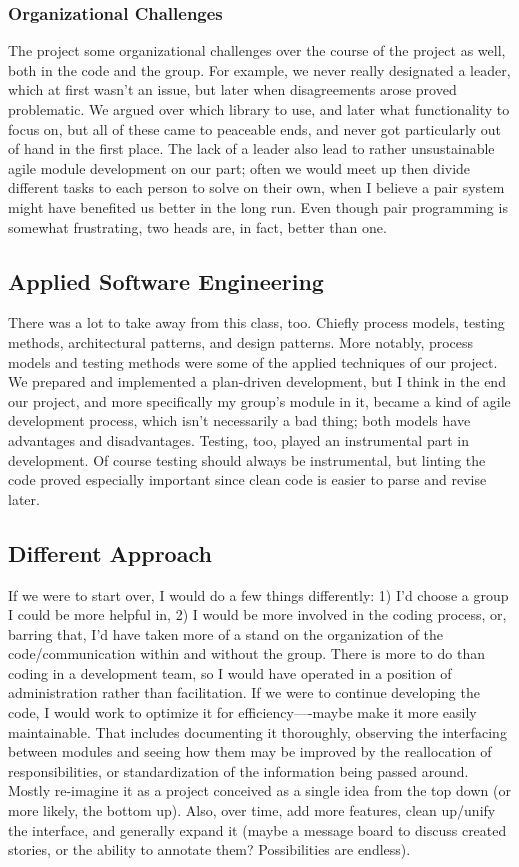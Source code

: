 \documentclass[a4paper]{article}
\begin{document}
\subsubsection{Organizational Challenges}
The project some organizational challenges over the course of the project as well, both in the code and the group. For example, we never really designated a leader, which at first wasn't an issue, but later when disagreements arose proved problematic. We argued over which library to use, and later what functionality to focus on, but all of these came to peaceable ends, and never got particularly out of hand in the first place. The lack of a leader also lead to rather unsustainable agile module development on our part; often we would meet up then divide different tasks to each person to solve on their own, when I believe a pair system might have benefited us better in the long run. Even though pair programming is somewhat frustrating, two heads are, in fact, better than one. 

\subsection{Applied Software Engineering}
There was a lot to take away from this class, too. Chiefly process models, testing methods, architectural patterns, and design patterns. More notably, process models and testing methods were some of the applied techniques of our project. We prepared and implemented a plan-driven development, but I think in the end our project, and more specifically my group's module in it, became a kind of agile development process, which isn't necessarily a bad thing; both models have advantages and disadvantages. Testing, too, played an instrumental part in development. Of course testing should always be instrumental, but linting the code proved especially important since clean code is easier to parse and revise later.

\subsection{Different Approach}
If we were to start over, I would do a few things differently: 1) I'd choose a group I could be more helpful in, 2) I would be more involved in the coding process, or, barring that, I'd have taken more of a stand on the organization of the code/communication within and without the group. There is more to do than coding in a development team, so I would have operated in a position of administration rather than facilitation. If we were to continue developing the code, I would work to optimize it for efficiency—-maybe make it more easily maintainable. That includes documenting it thoroughly, observing the interfacing between modules and seeing how them may be improved by the reallocation of responsibilities, or standardization of the information being passed around. Mostly re-imagine it as a project conceived as a single idea from the top down (or more likely, the bottom up). Also, over time, add more features, clean up/unify the interface, and generally expand it (maybe a message board to discuss created stories, or the ability to annotate them? Possibilities are endless).
\end{document}
